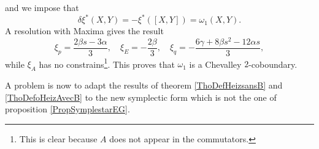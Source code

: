 and we impose that
\begin{equation}
  \delta\xi^*(X,Y)=-\xi^*([X,Y])=\omega_{1}(X,Y).
\end{equation}
A resolution with Maxima
 gives the result
\begin{equation}  \label{EqSolxialgun}
\xi_{p}=\frac{ 2\beta s-3\alpha }{ 3 },\quad\xi_{E}=-\frac{ 2\beta }{ 3 },\quad\xi_{q}=-\frac{ 6\gamma+8 \beta s^{2}-12\alpha s }{ 3 },
\end{equation}
while $\xi_{A}$ has no constrains\footnote{This is clear because $A$ does not appear in the commutators.}. This proves that $\omega_{1}$ is a Chevalley $2$-coboundary.

A problem is now to adapt the results of theorem \ref{ThoDefHeizsansB} and \ref{ThoDefoHeizAvecB} to the new symplectic form which is not the one of proposition \ref{PropSymplestarEG}. 

